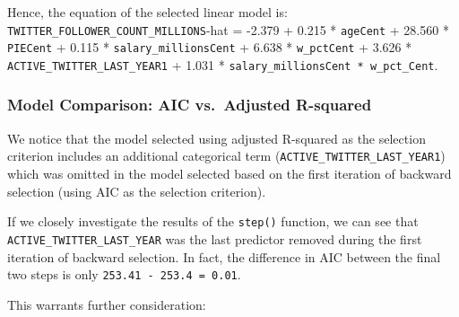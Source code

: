\documentclass[]{article}
\newenvironment{Shaded}{\begin{snugshade}}{\end{snugshade}}
\newcommand{\DataTypeTok}[1]{\textcolor[rgb]{0.13,0.29,0.53}{#1}}
\newcommand{\DecValTok}[1]{\textcolor[rgb]{0.00,0.00,0.81}{#1}}
\newcommand{\KeywordTok}[1]{\textcolor[rgb]{0.13,0.29,0.53}{\textbf{#1}}}
\newcommand{\NormalTok}[1]{#1}
\newcommand{\OperatorTok}[1]{\textcolor[rgb]{0.81,0.36,0.00}{\textbf{#1}}}
\newcommand{\OtherTok}[1]{\textcolor[rgb]{0.56,0.35,0.01}{#1}}
\newcommand{\StringTok}[1]{\textcolor[rgb]{0.31,0.60,0.02}{#1}}
\begin{document}
Hence, the equation of the selected linear model is:
\texttt{TWITTER\_FOLLOWER\_COUNT\_MILLIONS}-hat = -2.379 + 0.215 *
\texttt{ageCent} + 28.560 * \texttt{PIECent} + 0.115 *
\texttt{salary\_millionsCent} + 6.638 * \texttt{w\_pctCent} + 3.626 *
\texttt{ACTIVE\_TWITTER\_LAST\_YEAR1} + 1.031 *
\texttt{salary\_millionsCent\ *\ w\_pct\_Cent}.

\hypertarget{model-comparison-aic-vs.adjusted-r-squared}{%
\subsubsection{Model Comparison: AIC vs.~Adjusted
R-squared}\label{model-comparison-aic-vs.adjusted-r-squared}}

We notice that the model selected using adjusted R-squared as the
selection criterion includes an additional categorical term
(\texttt{ACTIVE\_TWITTER\_LAST\_YEAR1}) which was omitted in the model
selected based on the first iteration of backward selection (using AIC
as the selection criterion).

If we closely investigate the results of the \texttt{step()} function,
we can see that \texttt{ACTIVE\_TWITTER\_LAST\_YEAR} was the last
predictor removed during the first iteration of backward selection. In
fact, the difference in AIC between the final two steps is only
\texttt{253.41\ -\ 253.4\ =\ 0.01}.

This warrants further consideration:

\begin{Shaded}
\end{Shaded}
\end{document}
